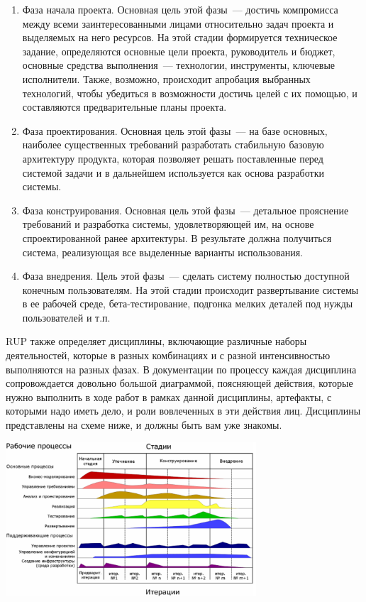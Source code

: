 \documentclass{../../text-style}
\begin{document}
\begin{enumerate}
    \item Фаза начала проекта. Основная цель этой фазы~--- достичь компромисса между всеми заинтересованными лицами относительно задач проекта и выделяемых на него ресурсов. На этой стадии формируется техническое задание, определяются основные цели проекта, руководитель и бюджет, основные средства выполнения~--- технологии, инструменты, ключевые исполнители. Также, возможно, происходит апробация выбранных технологий, чтобы убедиться в возможности достичь целей с их помощью, и составляются предварительные планы проекта.
    \item Фаза проектирования. Основная цель этой фазы~--- на базе основных, наиболее существенных требований разработать стабильную базовую архитектуру продукта, которая позволяет решать поставленные перед системой задачи и в дальнейшем используется как основа разработки системы.
    \item Фаза конструирования. Основная цель этой фазы~--- детальное прояснение требований и разработка системы, удовлетворяющей им, на основе спроектированной ранее архитектуры. В результате должна получиться система, реализующая все выделенные варианты использования.
    \item Фаза внедрения. Цель этой фазы~--- сделать систему полностью доступной конечным пользователям. На этой стадии происходит развертывание системы в ее рабочей среде, бета-тестирование, подгонка мелких деталей под нужды пользователей и т.п.
\end{enumerate}

RUP также определяет дисциплины, включающие различные наборы деятельностей, которые в разных комбинациях и с разной интенсивностью выполняются на разных фазах. В документации по процессу каждая дисциплина сопровождается довольно большой диаграммой, поясняющей действия, которые нужно выполнить в ходе работ в рамках данной дисциплины, артефакты, с которыми надо иметь дело, и роли вовлеченных в эти действия лиц. Дисциплины представлены на схеме ниже, и должны быть вам уже знакомы. 

\begin{center}
    \includegraphics[width=0.7\textwidth]{rupProcesses.png}
\end{center}
\end{document}
